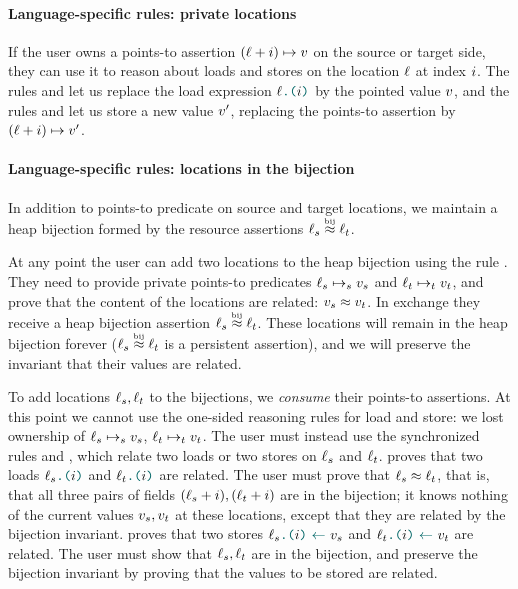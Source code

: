 \paragraph{Language-specific rules: private locations}
If the user owns a points-to assertion $(\datalangLoc + \datalangIdx) \iPointsto \datalangVal$ on the source or target side, they can use it to reason about loads and stores on the location $\datalangLoc$ at index $\datalangIdx$.
The rules  and  let us replace the load expression $\datalangLoad{\datalangLoc}{\datalangIdx}$ by the pointed value $\datalangVal$, and the rules  and  let us store a new value $\datalangVal'$, replacing the points-to assertion by $(\datalangLoc + \datalangIdx) \iPointsto \datalangVal'$.

\paragraph{Language-specific rules: locations in the bijection}
In addition to points-to predicate on source and target locations, we maintain a heap bijection formed by the resource assertions $\datalangLoc_s \iInBij \datalangLoc_t$.

At any point the user can add two locations to the heap bijection using the rule .
They need to provide private points-to predicates $\datalangLoc_s \iPointsto_s \datalangVal_s$ and $\datalangLoc_t \iPointsto_t \datalangVal_t$, and prove that the content of the locations are related: $\datalangVal_s \iSimilar \datalangVal_t$.
In exchange they receive a heap bijection assertion $\datalangLoc_s \iInBij \datalangLoc_t$.
These locations will remain in the heap bijection forever ($\datalangLoc_s \iInBij \datalangLoc_t$ is a persistent assertion), and we will preserve the invariant that their values are related.

To add locations $\datalangLoc_s, \datalangLoc_t$ to the bijections, we \emph{consume} their points-to assertions.
At this point we cannot use the one-sided reasoning rules for load and store: we lost ownership of $\datalangLoc_s \iPointsto_s \datalangVal_s$, $\datalangLoc_t \iPointsto_t \datalangVal_t$.
The user must instead use the synchronized rules  and , which relate two loads or two stores on $\datalangLoc_s$ and $\datalangLoc_t$.
 proves that two loads $\datalangLoad{\datalangLoc_s}{\datalangIdx}$ and $\datalangLoad{\datalangLoc_t}{\datalangIdx}$ are related.
The user must prove that $\datalangLoc_s \iSimilar \datalangLoc_t$, that is, that all three pairs of fields $(\datalangLoc_s + \datalangIdx), (\datalangLoc_t + \datalangIdx)$ are in the bijection; it knows nothing of the current values $\datalangVal_s, \datalangVal_t$ at these locations, except that they are related by the bijection invariant.
 proves that two stores $\datalangStore{\datalangLoc_s}{\datalangIdx}{\datalangVal_s}$ and $\datalangStore{\datalangLoc_t}{\datalangIdx}{\datalangVal_t}$ are related.
The user must show that $\datalangLoc_s, \datalangLoc_t$ are in the bijection, and preserve the bijection invariant by proving that the values to be stored are related.

